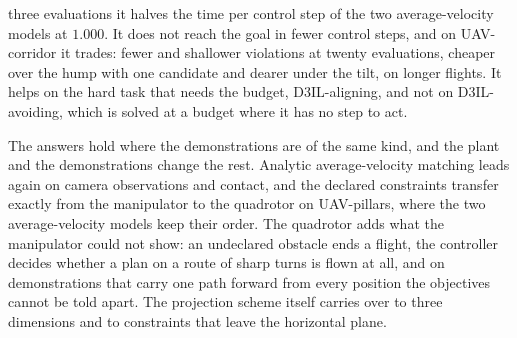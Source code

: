 \begin{description}
    three evaluations it halves the time per control step of the two average-velocity models at
    $1.000$. It does not reach the goal in fewer control steps, and on UAV-corridor it trades: fewer
    and shallower violations at twenty evaluations, cheaper over the hump with one candidate and
    dearer under the tilt, on longer flights. It helps on the hard task that needs the budget,
    D3IL-aligning, and not on D3IL-avoiding, which is solved at a budget where it has no step to act.
  \item[RQ3 --- Transfer.] The answers hold where the demonstrations are of the same kind, and the
    plant and the demonstrations change the rest. Analytic average-velocity matching leads again on
    camera observations and contact, and the declared constraints transfer exactly from the
    manipulator to the quadrotor on UAV-pillars, where the two average-velocity models keep their
    order. The quadrotor adds what the manipulator could not show: an undeclared obstacle ends a
    flight, the controller decides whether a plan on a route of sharp turns is flown at all, and on
    demonstrations that carry one path forward from every position the objectives cannot be told
    apart. The projection scheme itself carries over to three dimensions and to constraints that leave
    the horizontal plane.
\end{description}
